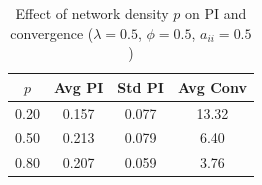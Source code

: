 
\begin{table}[H]
\centering
\small
\begin{tabular}{cccc}
\hline
$p$ & Avg PI & Std PI & Avg Conv \\
\hline
0.20 & 0.157 & 0.077 & 13.32 \\
0.50 & 0.213 & 0.079 & 6.40 \\
0.80 & 0.207 & 0.059 & 3.76 \\
\hline
\end{tabular}
\caption{Effect of network density $p$ on PI and convergence ($\lambda=0.5$, $\phi=0.5$, $a_{ii}=0.5$)}
\end{table}
